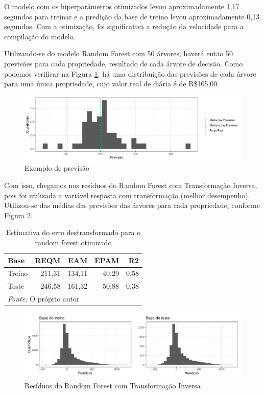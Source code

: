 \documentclass[
	12pt,				%
	a4paper,		%
	oneside,    %
	chapter=TITLE,		   %
	section=TITLE,		   %
	subsection=TITLE,	   %
	subsubsection=TITLE, %
	english,			%
	french,				%
	spanish,			%
	brazil,				%
]{abntex2}
\begin{document}
O modelo com os hiperparâmetros otimizados levou aproximadamente 1,17
segundos para treinar e a predição da base de treino levou
aproximadamente 0,13 segundos. Com a otimização, foi significativa a
redução da velocidade para a compilação do modelo.

Utilizando-se do modelo Random Forest com 50 árvores, haverá então 50
previsões para cada propriedade, resultado de cada árvore de decisão.
Como podemos verificar na Figura \ref{exemplo_pred}, há uma distribuição
das previsões de cada árvore para uma única propriedade, cujo valor real
de diária é de R\$105,00.

\begin{figure}
\centering
\includegraphics{00-TCC_files/figure-latex/exemplo_pred-1.pdf}
\caption{\label{exemplo_pred}Exemplo de previsão}
\end{figure}

Com isso, chegamos nos resíduos do Random Forest com Transformação
Inversa, pois foi utilizada a variável resposta com transformação
(melhor desempenho). Utilizou-se das médias das previsões das árvores
para cada propriedade, conforme Figura \ref{resid_rf_inv}.

\begin{table}

\caption{\label{tab:rf1_metricas}Estimativa do erro destransformado para o random forest otimizado}
\centering
\begin{tabular}[t]{l|r|r|r|r}
\hline
Base & REQM & EAM & EPAM & R2\\
\hline
Treino & 211,31 & 134,11 & 40,29 & 0,58\\
\hline
Teste & 246,58 & 161,32 & 50,88 & 0,38\\
\hline
\multicolumn{5}{l}{\textit{Fonte: } O próprio autor}\\
\end{tabular}
\end{table}

\begin{figure}
\centering
\includegraphics{00-TCC_files/figure-latex/resid_rf_inv-1.pdf}
\caption{\label{resid_rf_inv}Resíduos do Random Forest com Transformação
Inversa}
\end{figure}
\end{document}
